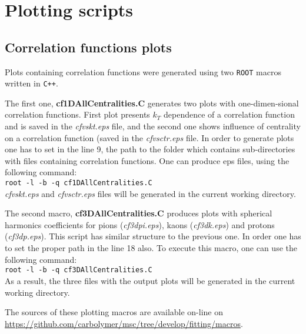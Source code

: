 %
\chapter{Plotting scripts}
\label{a:c}
  \section{Correlation functions plots}
    Plots containing correlation functions were generated using two \verb|ROOT| macros written in \verb|C++|.
    
    The first one, \textbf{cf1DAllCentralities.C} generates two plots with one-dimen-sional correlation functions.
    First plot presents $k_T$ dependence of a correlation function and is saved in the \textit{cfvskt.eps} file, and the second one shows influence of centrality on a correlation function (saved in the \textit{cfvsctr.eps} file.
    In order to generate plots one has to set in the line 9, the path to the folder which contains sub-directories with files containing correlation functions.
    One can produce eps files, using the following command:\\
    \verb|root -l -b -q cf1DAllCentralities.C|\\
    \textit{cfvskt.eps} and \textit{cfvsctr.eps} files will be generated in the current working directory.

    The second macro, \textbf{cf3DAllCentralities.C} produces plots with spherical harmonics coefficients for pions (\textit{cf3dpi.eps}), kaons (\textit{cf3dk.eps}) and protons (\textit{cf3dp.eps}).
    This script has similar structure to the previous one.
    In order one has to set the proper path in the line 18 also.
    To execute this macro, one can use the following command:\\
    \verb|root -l -b -q cf3DAllCentralities.C|\\
    As a result, the three files with the output plots will be generated in the current working directory.

    The sources of these plotting macros are available on-line on \url{https://github.com/carbolymer/msc/tree/develop/fitting/macros}.
